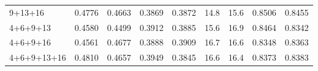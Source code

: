 \begin{table}[ht]
\begin{center}
\begin{tabular}{l cc cc cc cc}
9+13+16          & 0.4776          & 0.4663          & 0.3869          & 0.3872          & 14.8          & 15.6          & 0.8506          & 0.8455          \\
4+6+9+13         & 0.4580          & 0.4499          & 0.3912          & 0.3885          & 15.6          & 16.9          & 0.8464          & 0.8342          \\
4+6+9+16         & 0.4561          & 0.4677          & 0.3888          & 0.3909          & 16.7          & 16.6          & 0.8348          & 0.8363          \\
\midrule
4+6+9+13+16      & 0.4810          & 0.4657          & 0.3949          & 0.3845          & 16.6          & 16.4          & 0.8373          & 0.8383          \\
\bottomrule
\end{tabular}
\end{center}
\end{table}


